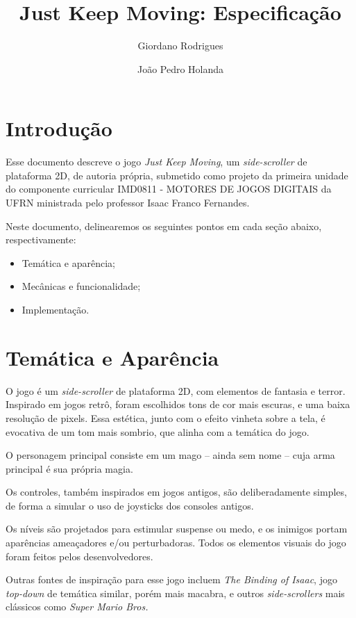 \documentclass[a4paper]{article}
\title{Just Keep Moving: Especificação}
\author{Giordano Rodrigues \and João Pedro Holanda}
\date{}
\begin{document}
\maketitle

\section{Introdução}

Esse documento descreve o jogo \emph{Just Keep Moving}, um \emph{side-scroller} de plataforma 2D, de autoria própria, submetido como projeto da primeira unidade do componente curricular IMD0811 - MOTORES DE JOGOS DIGITAIS da UFRN ministrada pelo professor Isaac Franco Fernandes.

Neste documento, delinearemos os seguintes pontos em cada seção abaixo, respectivamente:
\begin{itemize}
	\item Temática e aparência;
	\item Mecânicas e funcionalidade;
	\item Implementação.
\end{itemize}

\section{Temática e Aparência}

O jogo é um \emph{side-scroller} de plataforma 2D, com elementos de fantasia e terror. Inspirado em jogos retrô, foram escolhidos tons de cor mais escuras, e uma baixa resolução de pixels. Essa estética, junto com o efeito vinheta sobre a tela, é evocativa de um tom mais sombrio, que alinha com a temática do jogo.

O personagem principal consiste em um mago -- ainda sem nome -- cuja arma principal é sua própria magia.

Os controles, também inspirados em jogos antigos, são deliberadamente simples, de forma a simular o uso de joysticks dos consoles antigos.

Os níveis são projetados para estimular suspense ou medo, e os inimigos portam aparências ameaçadores e/ou perturbadoras. Todos os elementos visuais do jogo foram feitos pelos desenvolvedores.

Outras fontes de inspiração para esse jogo incluem \emph{The Binding of Isaac}, jogo \emph{top-down} de temática similar, porém mais macabra, e outros \emph{side-scrollers} mais clássicos como \emph{Super Mario Bros.}
\end{document}
